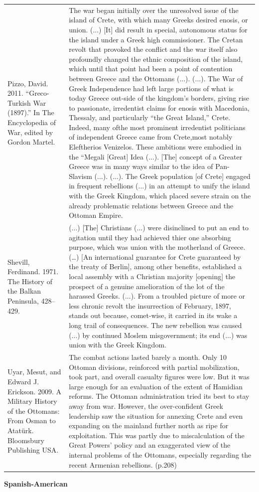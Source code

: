 {\begin{longtable}{p{}p{}}
Pizzo, David. 2011. “Greco-Turkish War (1897).” In The Encyclopedia of War, edited by Gordon Martel. & The war began initially over the unresolved issue of the island of Crete, with which many Greeks desired enosis, or union. (...) [It] did result in special, autonomous status for the island under a Greek high commissioner. The Cretan revolt that provoked the conflict and the war itself also profoundly changed the ethnic composition of the island, which until that point had been a point of contention between Greece and the Ottomans (...). (...). The War of Greek Independence had left large portions of what is today Greece out-side of the kingdom's borders, giving rise to passionate, irredentist claims for enosis with Macedonia, Thessaly, and particularly “the Great Island,” Crete. Indeed, many ofthe most prominent irredentist politicians of independent Greece came from Crete,most notably Eleftherios Venizelos. These ambitions were embodied in the “Megali [Great] Idea (...). [The] concept of a Greater Greece was in many ways similar to the idea of Pan-Slavism (...). (...). The Greek population [of Crete] engaged in frequent rebellions (...) in an attempt to unify the island with the Greek Kingdom, which placed severe strain on the already problematic relations between Greece and the Ottoman Empire. 
\\
Shevill, Ferdinand. 1971. The History of the Balkan Peninsula, 428–429. & (...) [The] Christians (...) were disinclined to put an end to agitation until they had achieved thier one absorbing purpose, which was union with the motherland of Greece. (…) [An international guarantee for Crete guaranteed by the treaty of Berlin], among other benefits, established a local assembly with a Christian majority [opening] the prospect of a genuine amelioration of the lot of the harassed Greeks. (...). From a troubled picture of more or less chronic revolt the insurrection of February, 1897, stands out because, comet-wise, it carried in its wake a long trail of consequences. The new rebellion was caused (...) by continued Moslem misgovernment; its end (...) was union with the Greek Kingdom. 
\\
Uyar, Mesut, and Edward J. Erickson. 2009. A Military History of the Ottomans: From Osman to Atatürk. Bloomsbury Publishing USA. & The combat actions lasted barely a month. Only 10 Ottoman divisions, reinforced with partial mobilization, took part, and overall casualty figures were low. But it was large enough for an evaluation of the extent of Hamidian reforms. 
The Ottoman administration tried its best to stay away from war. However, the
over-confident Greek leadership saw the situation for annexing Crete and even expanding on the mainland further north as ripe for exploitation. This was partly due to miscalculation of the Great Powers' policy and an exaggerated view of the internal problems of the Ottomans, especially regarding the recent Armenian rebellions. (p.208)
\\
\end{longtable}}
\clearpage
         \textbf{Spanish-American} 

